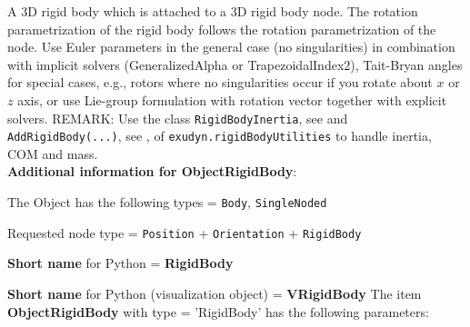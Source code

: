 %
\newpage

\label{sec:item:ObjectRigidBody}
A 3D rigid body which is attached to a 3D rigid body node. The rotation parametrization of the rigid body follows the rotation parametrization of the node. Use Euler parameters in the general case (no singularities) in combination with implicit solvers (GeneralizedAlpha or TrapezoidalIndex2), Tait-Bryan angles for special cases, e.g., rotors where no singularities occur if you rotate about $x$ or $z$ axis, or use Lie-group formulation with rotation vector together with explicit solvers. REMARK: Use the class \texttt{RigidBodyInertia}, see  and \texttt{AddRigidBody(...)}, see , of \texttt{exudyn.rigidBodyUtilities} to handle inertia, COM and mass.
 \vspace{12pt}
 \\{\bf Additional information for ObjectRigidBody}:
\bi
  \item The Object has the following types = \texttt{Body}, \texttt{SingleNoded}
  \item Requested node type = \texttt{Position} + \texttt{Orientation} + \texttt{RigidBody}
  \item {\bf Short name} for Python = {\bf RigidBody}  \item {\bf Short name} for Python (visualization object) = {\bf VRigidBody}\ei
\vspace{12pt} \noindent The item {\bf ObjectRigidBody} with type = 'RigidBody' has the following parameters:\vspace{-1cm}\\ 
